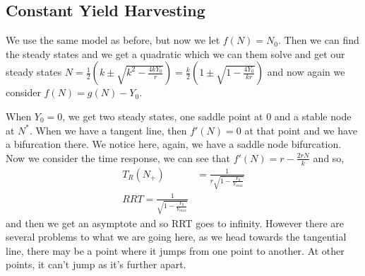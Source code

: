 \subsection{Constant Yield Harvesting}
We use the same model as before, but now we let $f(N) = N_0$. Then we can find the steady states and we get a quadratic which we can them solve and get our steady states $N = \frac{1}{2}\left(k \pm \sqrt{k^2 - \frac{4kY_0}{r}}\right) = \frac{k }{2}\left( 1 \pm \sqrt{1 - \frac{4Y_0}{kr}} \right)$ and now again we consider $f(N) = g(N) - Y_0$.

\begin{figure}[!ht]
\centering
{}
\caption{}
\end{figure}

When $Y_0 = 0$, we get two steady states, one saddle point at $0$ and a stable node at $N^*$. When we have a tangent line, then $f'(N) = 0$ at that point and we have a bifurcation there. We notice here, again, we have a saddle node bifurcation.\\

\noindent
Now we consider the time response, we can see that $f'(N) = r - \frac{2rN}{k}$ and so,
\begin{align*}
  T_R(N_+) &= \frac{1}{r\sqrt{1 - \frac{Y_0}{Y_{max}}}}\\
  RRT = \frac{1}{\sqrt{1 - \frac{Y_0}{Y_{max}}}}
\end{align*}
and then we get an asymptote and so RRT goes to infinity. However there are several problems to what we are going here, as we head towards the tangential line, there may be a point where it jumps from one point to another. At other points, it can't jump as it's further apart.

